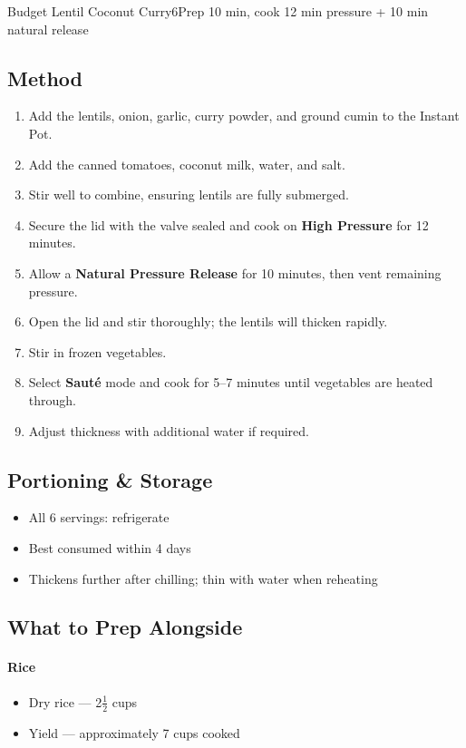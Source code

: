 \begin{recipebox}{Budget Lentil Coconut Curry}{6}{Prep 10 min, cook 12 min pressure + 10 min natural release}
\subsection*{Method}
\begin{enumerate}
    \item Add the lentils, onion, garlic, curry powder, and ground cumin to the Instant Pot.
    \item Add the canned tomatoes, coconut milk, water, and salt.
    \item Stir well to combine, ensuring lentils are fully submerged.
    \item Secure the lid with the valve sealed and cook on \textbf{High Pressure} for 12 minutes.
    \item Allow a \textbf{Natural Pressure Release} for 10 minutes, then vent remaining pressure.
    \item Open the lid and stir thoroughly; the lentils will thicken rapidly.
    \item Stir in frozen vegetables.
    \item Select \textbf{Sauté} mode and cook for 5--7 minutes until vegetables are heated through.
    \item Adjust thickness with additional water if required.
\end{enumerate}

\subsection*{Portioning \& Storage}
\begin{itemize}
    \item All 6 servings: refrigerate
    \item Best consumed within 4 days
    \item Thickens further after chilling; thin with water when reheating
\end{itemize}

\subsection*{What to Prep Alongside}

\paragraph{Rice}
\begin{itemize}
    \item Dry rice — 2$\tfrac{1}{2}$ cups
    \item Yield — approximately 7 cups cooked
\end{itemize}


\end{recipebox}
